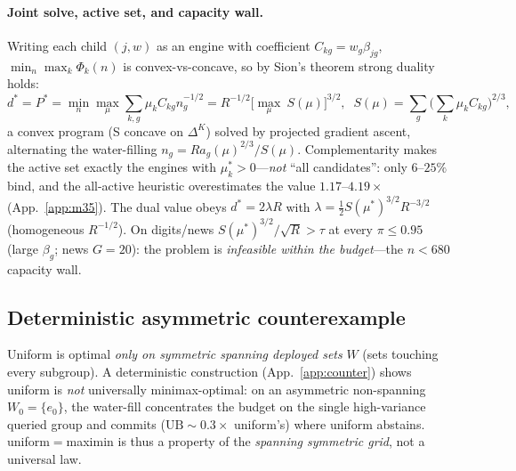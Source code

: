\documentclass{article}
\begin{document}
\paragraph{Joint solve, active set, and capacity wall.} Writing each child $(j,w)$ as an
engine with coefficient $C_{kg}=w_g\beta_{jg}$, $\min_n\max_k\Phi_k(n)$ is convex-vs-concave,
so by Sion's theorem strong duality holds:
\begin{equation}
  d^*=P^*=\min_n\max_\mu\sum_{k,g}\mu_k C_{kg}n_g^{-1/2}
       =R^{-1/2}\big[\max_{\mu}\ S(\mu)\big]^{3/2},\;\;
  S(\mu)=\sum_g\big(\textstyle\sum_k \mu_k C_{kg}\big)^{2/3},
  \label{eq:duality}
\end{equation}
a convex program (S concave on $\Delta^K$) solved by projected gradient ascent, alternating
the water-filling $n_g=R a_g(\mu)^{2/3}/S(\mu)$. Complementarity makes the active set exactly
the engines with $\mu^*_k>0$---\emph{not} ``all candidates'': only $6$--$25\%$ bind, and the
all-active heuristic overestimates the value $1.17$--$4.19\times$ (App.~\ref{app:m35}). The
dual value obeys $d^*=2\lambda R$ with $\lambda=\tfrac12 S(\mu^*)^{3/2}R^{-3/2}$
(homogeneous $R^{-1/2}$). On digits/news $S(\mu^*)^{3/2}/\sqrt R>\tau$ at every $\pi\le0.95$
(large $\beta_g$; news $G{=}20$): the problem is \emph{infeasible within the budget}---the
$n<680$ capacity wall.

\subsection{Deterministic asymmetric counterexample}
Uniform is optimal \emph{only on symmetric spanning deployed sets} $W$ (sets touching every
subgroup). A deterministic construction (App.~\ref{app:counter}) shows uniform is \emph{not}
universally minimax-optimal: on an asymmetric non-spanning $W_0=\{e_0\}$, the water-fill
concentrates the budget on the single high-variance queried group and commits
($\mathrm{UB}\sim0.3\times$ uniform's) where uniform abstains. uniform$=$maximin is thus a
property of the \emph{spanning symmetric grid}, not a universal law.
\end{document}
